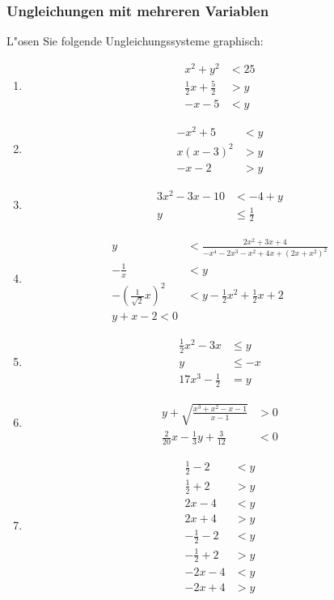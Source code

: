 \subsubsection{Ungleichungen mit mehreren Variablen}
L"osen Sie folgende Ungleichungssysteme graphisch:
\begin{enumerate}\abovedisplayskip-1em
\item{ \begin{align*}x^2 +y^2 &< 25\\ \frac{1}{2}x +\frac{5}{2} &> y\\ -x-5 &< y\end{align*}}
\item{ \begin{align*}-x^2 +5 &< y\\ x(x-3)^2 &> y\\ -x-2 &> y\end{align*}}
\item{ \begin{align*}3x^2-3x-10 &< -4 +y\\ y &\leq \frac{1}{2}\end{align*}}
\item{ \begin{align*}y &< \frac{2x^2+3x+4}{-x^4-2x^3-x^2+4x+(2x+x^2)^2}\\ -\frac{1}{x} &< y\\ -(\frac{1}{\sqrt{2}}x)^2 &< y - \frac{1}{2}x^2 + \frac{1}{2}x +2\\ y+x-2<0\end{align*}}
\item{ \begin{align*}\frac{1}{2}x^2 - 3x &\leq y\\ y &\leq -x\\ 17x^3 - \frac{1}{2} &= y\end{align*}}
\item{ \begin{align*}y + \sqrt{\frac{x^3 + x^2 - x - 1}{x - 1}} &> 0\\ \frac{2}{20}x - \frac{1}{3}y + \frac{3}{12} &< 0\end{align*}}
\item{ \begin{align*}\frac{1}{2} - 2 &< y\\ \frac{1}{2} + 2 &> y\\ 2x - 4 &< y\\ 2x + 4 &> y\\ -\frac{1}{2} - 2 &< y\\ -\frac{1}{2} + 2 &> y\\ -2x - 4 &< y\\ -2x + 4 &> y\end{align*}}

\end{enumerate}
